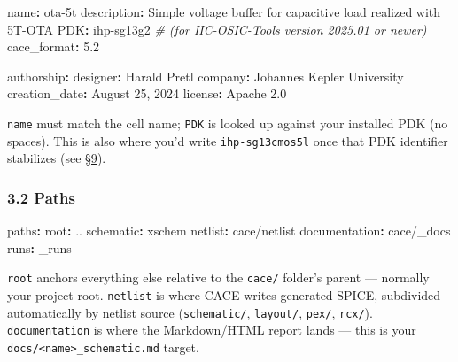 \documentclass[
]{article}
\newenvironment{Shaded}{}{}
\newcommand{\AttributeTok}[1]{\textcolor[rgb]{0.49,0.56,0.16}{#1}}
\newcommand{\CommentTok}[1]{\textcolor[rgb]{0.38,0.63,0.69}{\textit{#1}}}
\newcommand{\FloatTok}[1]{\textcolor[rgb]{0.25,0.63,0.44}{#1}}
\newcommand{\FunctionTok}[1]{\textcolor[rgb]{0.02,0.16,0.49}{#1}}
\newcommand{\KeywordTok}[1]{\textcolor[rgb]{0.00,0.44,0.13}{\textbf{#1}}}
\begin{document}
\begin{Shaded}
\begin{Highlighting}[]
\FunctionTok{name}\KeywordTok{:}\AttributeTok{           ota{-}5t}
\FunctionTok{description}\KeywordTok{:}\AttributeTok{    Simple voltage buffer for capacitive load realized with 5T{-}OTA}
\FunctionTok{PDK}\KeywordTok{:}\AttributeTok{            ihp{-}sg13g2}\CommentTok{ \# (for IIC{-}OSIC{-}Tools version 2025.01 or newer)}
\FunctionTok{cace\_format}\KeywordTok{:}\AttributeTok{    }\FloatTok{5.2}

\FunctionTok{authorship}\KeywordTok{:}
\AttributeTok{  }\FunctionTok{designer}\KeywordTok{:}\AttributeTok{         Harald Pretl}
\AttributeTok{  }\FunctionTok{company}\KeywordTok{:}\AttributeTok{          Johannes Kepler University}
\AttributeTok{  }\FunctionTok{creation\_date}\KeywordTok{:}\AttributeTok{    August 25, 2024}
\AttributeTok{  }\FunctionTok{license}\KeywordTok{:}\AttributeTok{          Apache 2.0}
\end{Highlighting}
\end{Shaded}

\texttt{name} must match the cell name; \texttt{PDK} is looked up
against your installed PDK (no spaces). This is also where you'd write
\texttt{ihp-sg13cmos5l} once that PDK identifier stabilizes (see
\protect\hyperlink{9-per-pdk-adaptation-sg13g2cmos5l-gf180mcu-sky130}{§9}).

\hypertarget{paths}{%
\subsubsection{3.2 Paths}\label{paths}}

\begin{Shaded}
\begin{Highlighting}[]
\FunctionTok{paths}\KeywordTok{:}
\AttributeTok{  }\FunctionTok{root}\KeywordTok{:}\AttributeTok{             ..}
\AttributeTok{  }\FunctionTok{schematic}\KeywordTok{:}\AttributeTok{        xschem}
\AttributeTok{  }\FunctionTok{netlist}\KeywordTok{:}\AttributeTok{          cace/netlist}
\AttributeTok{  }\FunctionTok{documentation}\KeywordTok{:}\AttributeTok{    cace/\_docs}
\AttributeTok{  }\FunctionTok{runs}\KeywordTok{:}\AttributeTok{             \_runs}
\end{Highlighting}
\end{Shaded}

\texttt{root} anchors everything else relative to the \texttt{cace/}
folder's parent --- normally your project root. \texttt{netlist} is
where CACE writes generated SPICE, subdivided automatically by netlist
source (\texttt{schematic/}, \texttt{layout/}, \texttt{pex/},
\texttt{rcx/}). \texttt{documentation} is where the Markdown/HTML report
lands --- this is your
\texttt{docs/\textless{}name\textgreater{}\_schematic.md} target.
\end{document}
